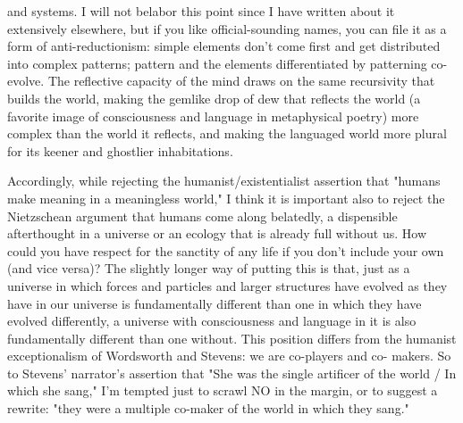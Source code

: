 \documentclass[draft]{article}
\begin{document}
and systems. I will not belabor this point since I have written about it extensively elsewhere, but if you like official-sounding names, you can file it as a form of anti-reductionism: simple elements don't come first and get distributed into complex patterns; pattern and the elements differentiated by patterning co-evolve. The reflective capacity of the mind draws on the same recursivity that builds the world, making the gemlike drop of dew that reflects the world (a favorite image of consciousness and language in metaphysical poetry) more complex than the world it reflects, and making the languaged world more plural for its keener and ghostlier inhabitations. \par Accordingly, while rejecting the humanist/existentialist assertion that "humans make meaning in a meaningless world," I think it is important also to reject the Nietzschean argument that humans come along belatedly, a dispensible afterthought in a universe or an ecology that is already full without us. How could you have respect for the sanctity of any life if you don't include your own (and vice versa)? The slightly longer way of putting this is that, just as a universe in which forces and particles and larger structures have evolved as they have in our universe is fundamentally different than one in which they have evolved differently, a universe with consciousness and language in it is also fundamentally different than one without. This position differs from the humanist exceptionalism of Wordsworth and Stevens: we are co-players and co- makers. So to Stevens' narrator's assertion that "She was the single artificer of the world / In which she sang," I'm tempted just to scrawl NO in the margin, or to suggest a rewrite: "they were a multiple co-maker of the world in which they sang." \par 
\end{document}
